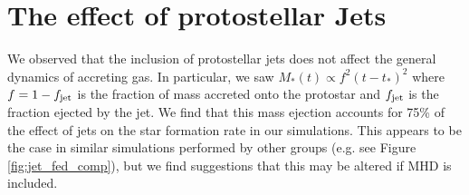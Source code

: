 \documentclass[../dissertation.tex]{subfiles}
\begin{document}

\section{The effect of protostellar Jets}

We observed that the inclusion of protostellar jets does not affect the general dynamics of accreting gas.
In particular, we saw $M_*(t) \propto f^2 (t-t_*)^2$ where $f = 1 - f_{\rm jet}$ is the fraction of mass accreted onto the protostar and $f_{\rm jet}$ is the fraction ejected by the jet.
We find that this mass ejection accounts for 75\% of the effect of jets on the star formation rate in our simulations.
This appears to be the case in similar simulations performed by other groups (e.g. see Figure \ref{fig:jet_fed_comp}), but we find suggestions that this may be altered if MHD is included.
\end{document}
